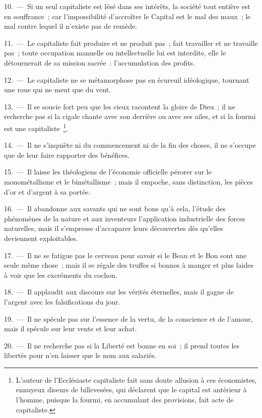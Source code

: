 \documentclass[french,twoside]{book} %
\begin{document}
10. — Si un seul capitaliste est lésé dans ses intérêts, la société tout entière est en souffrance ; car l’impossibilité d’accroître le Capital est le mal des maux ; le mal contre lequel il n’existe pas de remède.\par
11. — Le capitaliste fait produire et ne produit pas ; fait travailler et ne travaille pas ; toute occupation manuelle ou intellectuelle lui est interdite, elle le détournerait de sa mission sacrée : l’accumulation des profits.\par
12. — Le capitaliste ne se métamorphose pas en écureuil idéologique, tournant une roue qui ne meut que du vent.\par
13. — Il se soucie fort peu que les cieux racontent la gloire de Dieu ; il ne recherche pas si la cigale chante avec son derrière ou avec ses ailes, et si la fourmi est une capitaliste \footnote{L'auteur de l’Ecclésiaste capitaliste fait sans doute allusion à ces économistes, ennuyeux diseurs de billevesées, qui déclarent que le capital est antérieur à l’homme, puisque la fourmi, en accumulant des provisions, fait acte de capitaliste.}.\par
14. — Il ne s’inquiète ni du commencement ni de la fin des choses, il ne s’occupe que de leur faire rapporter des bénéfices.\par
15. — Il laisse les théologiens de l’économie officielle pérorer sur le monométallisme et le bimétallisme ; mais il empoche, sans distinction, les pièces d’or et d’argent à sa portée.\par
16. — Il abandonne aux savants qui ne sont bons qu’à cela, l’étude des phénomènes de la nature et aux inventeurs l’application industrielle des forces naturelles, mais il s’empresse d’accaparer leurs découvertes dès qu’elles deviennent exploitables.\par
17. — Il ne se fatigue pas le cerveau pour savoir si le Beau et le Bon sont une seule même chose ; mais il se régale des truffes si bonnes à manger et plus laides à voir que les excréments du cochon.\par
18. — Il applaudit aux discours sur les vérités éternelles, mais il gagne de l’argent avec les falsifications du jour.\par
19. — Il ne spécule pas sur l’essence de la vertu, de la conscience et de l’amour, mais il spécule sur leur vente et leur achat.\par
20. — Il ne recherche pas si la Liberté est bonne en soi ; il prend toutes les libertés pour n’en laisser que le nom aux salariés.\par
\end{document}
